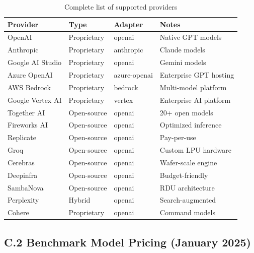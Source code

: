 \documentclass[english]{article}
\begin{document}
\begin{table}[H]
\centering
\caption{Complete list of supported providers}
\begin{tabular}{|l|l|l|p{5cm}|}
\hline
\textbf{Provider} & \textbf{Type} & \textbf{Adapter} & \textbf{Notes} \\
\hline
OpenAI & Proprietary & openai & Native GPT models \\
Anthropic & Proprietary & anthropic & Claude models \\
Google AI Studio & Proprietary & openai & Gemini models \\
Azure OpenAI & Proprietary & azure-openai & Enterprise GPT hosting \\
AWS Bedrock & Proprietary & bedrock & Multi-model platform \\
Google Vertex AI & Proprietary & vertex & Enterprise AI platform \\
Together AI & Open-source & openai & 20+ open models \\
Fireworks AI & Open-source & openai & Optimized inference \\
Replicate & Open-source & openai & Pay-per-use \\
Groq & Open-source & openai & Custom LPU hardware \\
Cerebras & Open-source & openai & Wafer-scale engine \\
Deepinfra & Open-source & openai & Budget-friendly \\
SambaNova & Open-source & openai & RDU architecture \\
Perplexity & Hybrid & openai & Search-augmented \\
Cohere & Proprietary & openai & Command models \\
\hline
\end{tabular}
\end{table}

\subsection*{C.2 Benchmark Model Pricing (January 2025)}
\end{document}
